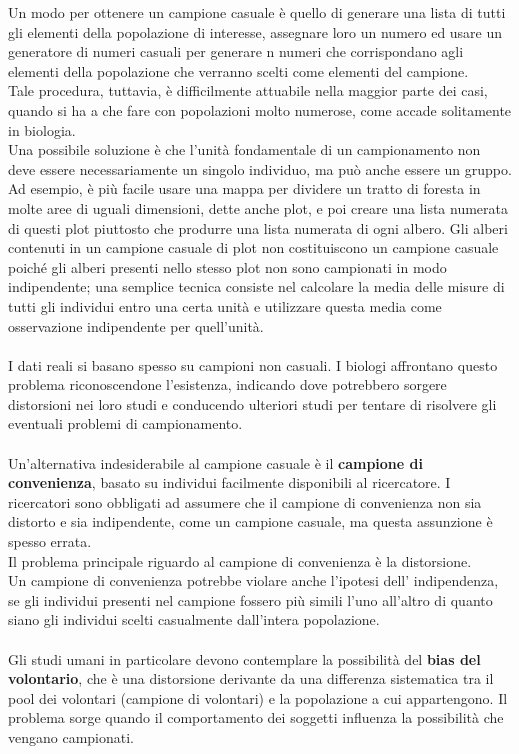 \documentclass[10pt, draft]{book}
\begin{document}
Un modo per ottenere un campione casuale è quello di generare una lista di tutti gli elementi della popolazione di interesse, assegnare loro un numero ed usare un generatore di numeri casuali per generare n numeri che corrispondano agli elementi della popolazione che verranno scelti come elementi del campione.
\\
Tale procedura, tuttavia, è difficilmente attuabile nella maggior parte dei casi, quando si ha a che fare con popolazioni molto numerose, come accade solitamente in biologia.
\\
Una possibile soluzione è che l'unità fondamentale di un campionamento non deve essere necessariamente un singolo individuo, ma può anche essere un gruppo.
\\
Ad esempio, è più facile usare una mappa per dividere un tratto di foresta in molte aree di uguali dimensioni, dette anche plot, e poi creare una lista numerata di questi plot piuttosto che produrre una lista numerata di ogni albero. Gli alberi contenuti in un campione casuale di plot non costituiscono un campione casuale poiché gli alberi presenti nello stesso plot non sono campionati in modo indipendente; una semplice tecnica consiste nel calcolare la media delle misure di tutti gli individui entro una certa unità e utilizzare questa media come osservazione indipendente per quell'unità.
\\
\\
I dati reali si basano spesso su campioni non casuali. I biologi affrontano questo problema riconoscendone l'esistenza, indicando dove potrebbero sorgere distorsioni nei loro studi e conducendo ulteriori studi per tentare di risolvere gli eventuali problemi di campionamento.
\\
\\
Un'alternativa indesiderabile al campione casuale è il \textbf{campione di convenienza}, basato su individui facilmente disponibili al ricercatore. I ricercatori sono obbligati ad assumere che il campione di convenienza non sia distorto e sia indipendente, come un campione casuale, ma questa assunzione è spesso errata.
\\
Il problema principale riguardo al campione di convenienza è la distorsione.
\\
Un campione di convenienza potrebbe violare anche l'ipotesi dell' indipendenza, se gli individui presenti nel campione fossero più simili l'uno all'altro di quanto siano gli individui scelti casualmente dall'intera popolazione.
\\
\\
Gli studi umani in particolare devono contemplare la possibilità del \textbf{bias del volontario}, che è una distorsione derivante da una differenza sistematica tra il pool dei volontari (campione di volontari) e la popolazione a cui appartengono. Il problema sorge quando il comportamento dei soggetti influenza la possibilità che vengano campionati.
\end{document}
